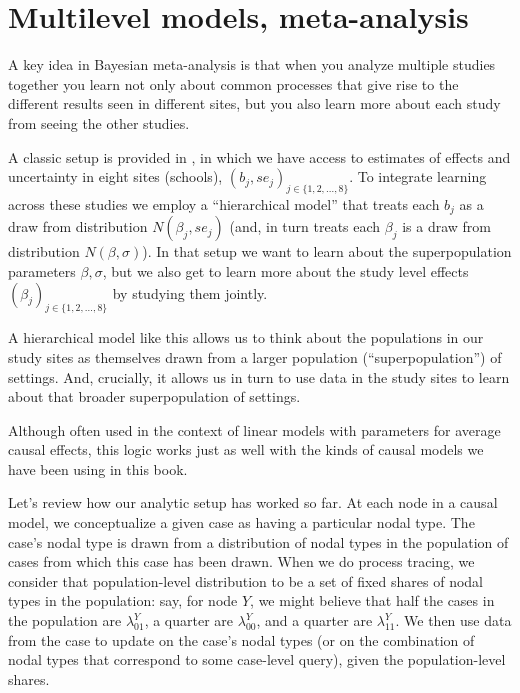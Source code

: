 \documentclass[
  12pt,
]{book}
\begin{document}
\hypertarget{multilevel-models-meta-analysis}{%
\section{Multilevel models, meta-analysis}\label{multilevel-models-meta-analysis}}

A key idea in Bayesian meta-analysis is that when you analyze multiple studies together you learn not only about common processes that give rise to the different results seen in different sites, but you also learn more about each study from seeing the other studies.

A classic setup is provided in \citet{gelman2013bayesian}, in which we have access to estimates of effects and uncertainty in eight sites (schools), \((b_j, se_j)_{j \in \{1,2,\dots,8\}}\). To integrate learning across these studies we employ a ``hierarchical model''
that treats each \(b_j\) as a draw from distribution \(N(\beta_j, se_j)\) (and, in turn treats each \(\beta_j\) is a draw from distribution \(N(\beta, \sigma)\)). In that setup we want to learn about the superpopulation parameters \(\beta, \sigma\), but we also get to learn more about the study level effects \((\beta_j)_{j \in \{1,2,\dots,8\}}\) by studying them jointly.

A hierarchical model like this allows us to think about the populations in our study sites as themselves drawn from a larger population (``superpopulation'') of settings. And, crucially, it allows us in turn to use data in the study sites to learn about that broader superpopulation of settings.

Although often used in the context of linear models with parameters for average causal effects, this logic works just as well with the kinds of causal models we have been using in this book.

Let's review how our analytic setup has worked so far. At each node in a causal model, we conceptualize a given case as having a particular nodal type. The case's nodal type is drawn from a distribution of nodal types in the population of cases from which this case has been drawn. When we do process tracing, we consider that population-level distribution to be a set of fixed shares of nodal types in the population: say, for node \(Y\), we might believe that half the cases in the population are \(\lambda^Y_{01}\), a quarter are \(\lambda^Y_{00}\), and a quarter are \(\lambda^Y_{11}\). We then use data from the case to update on the case's nodal types (or on the combination of nodal types that correspond to some case-level query), given the population-level shares.
\end{document}
